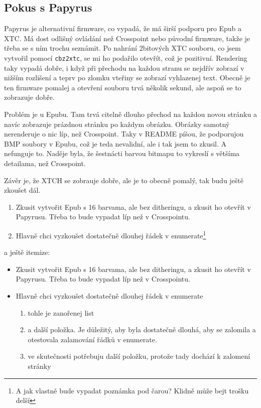 \documentclass{article}
\begin{document}



\subsection{Pokus s Papyrus}

Papyrus je alternativní firmware, co vypadá, že má širší podporu pro Epub a XTC. Má dost odlišný ovládání než Crosspoint nebo 
původní firmware, takže je třeba se s ním trochu seznámit. Po nahrání 2bitových XTC souboru, co jsem vytvořil pomocí \texttt{cbz2xtc}, 
se mi ho podařilo otevřít, což je pozitivní. Rendering taky vypadá dobře, i když při přechodu na každou stranu se nejdřív 
zobrazí v nižším rozlišení a teprv po zlomku vteřiny se zobrazí vyhlazenej text. Obecně je ten firmware pomalej a otevření 
souboru trvá několik sekund, ale aspoň se to zobrazuje dobře.

Problém je u Epubu. Tam trvá citelně dlouho přechod na každou novou stránku a navíc zobrazuje prázdnou stránku po každym obrázku. 
Obrázky samotný nerenderuje o nic líp, než Crosspoint. Taky v README píšou, že podporujou BMP soubory v Epubu, což je teda 
nevalidní, ale i tak jsem to zkusil. A nefunguje to. Naděje byla, že šestnácti barvou bitmapu to vykreslí s většíma detailama, 
než Crosspoint.

Závěr je, že XTCH se zobrauje dobře, ale je to obecně pomalý, tak budu ještě zkoušet dál.

\begin{enumerate}
  \item Zkusit vytvořit Epub s 16 barvama, ale bez ditheringu, a zkusit ho otevřít v Papyrusu. Třeba to bude vypadat líp než v Crosspointu.
  \item Hlavně chci vyzkoušet dostatečně dlouhej řádek v enumerate\footnote{A jak vlastně bude vypadat poznámka pod čarou? Klidně může bejt trošku delší}
\end{enumerate}

a ještě itemize: 

\begin{itemize}
  \item Zkusit vytvořit Epub s 16 barvama, ale bez ditheringu, a zkusit ho otevřít v Papyrusu. Třeba to bude vypadat líp než v Crosspointu.
  \item Hlavně chci vyzkoušet dostatečně dlouhej řádek v enumerate
    \begin{enumerate}
      \item tohle je zanořenej list
      \item a další položka. Je důležitý, aby byla dostatečně dlouhá, aby se zalomila a otestovala zalamování řádků v enumerate.
      \item ve skutečnosti potřebuju další položku, protože tady dochází k zalomení stránky
    \end{enumerate}
\end{itemize}
\end{document}
